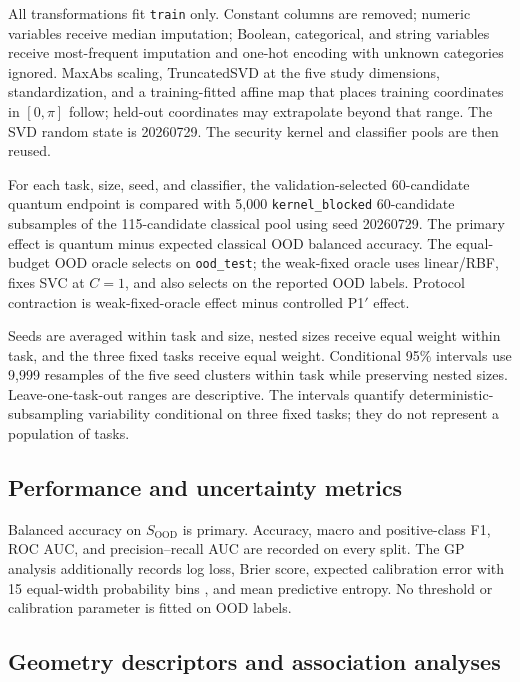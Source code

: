 \documentclass[referee,lineno,pdflatex,sn-nature]{sn-jnl}
\theoremstyle{thmstyleone}%
\theoremstyle{thmstyletwo}%
\theoremstyle{thmstylethree}%
\begin{document}
All transformations fit \texttt{train} only. Constant columns are removed; numeric variables receive median imputation; Boolean, categorical, and string variables receive most-frequent imputation and one-hot encoding with unknown categories ignored. MaxAbs scaling, TruncatedSVD at the five study dimensions, standardization, and a training-fitted affine map that places training coordinates in $[0,\pi]$ follow; held-out coordinates may extrapolate beyond that range. The SVD random state is 20260729. The security kernel and classifier pools are then reused.

For each task, size, seed, and classifier, the validation-selected 60-candidate quantum endpoint is compared with 5,000 \texttt{kernel\_blocked} 60-candidate subsamples of the 115-candidate classical pool using seed 20260729. The primary effect is quantum minus expected classical OOD balanced accuracy. The equal-budget OOD oracle selects on \texttt{ood\_test}; the weak-fixed oracle uses linear/RBF, fixes SVC at $C=1$, and also selects on the reported OOD labels. Protocol contraction is weak-fixed-oracle effect minus controlled P1$'$ effect.

Seeds are averaged within task and size, nested sizes receive equal weight within task, and the three fixed tasks receive equal weight. Conditional 95\% intervals use 9,999 resamples of the five seed clusters within task while preserving nested sizes. Leave-one-task-out ranges are descriptive. The intervals quantify deterministic-subsampling variability conditional on three fixed tasks; they do not represent a population of tasks.

\subsection{Performance and uncertainty metrics}

Balanced accuracy on $S_{\mathrm{OOD}}$ is primary. Accuracy, macro and positive-class F1, ROC AUC, and precision--recall AUC are recorded on every split. The GP analysis additionally records log loss, Brier score, expected calibration error with 15 equal-width probability bins \cite{guo2017calibration}, and mean predictive entropy. No threshold or calibration parameter is fitted on OOD labels.

\subsection{Geometry descriptors and association analyses}
\end{document}
